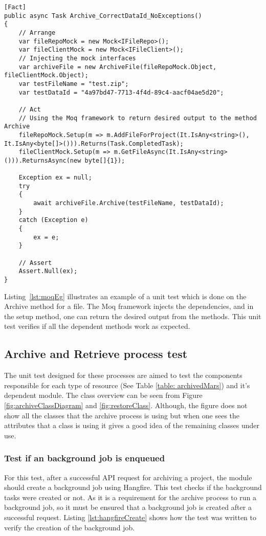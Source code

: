 \begin{lstlisting}[language={[Sharp]C}, caption={Example of faking objects using Moq framework}, captionpos=b,label={lst:moqEg}]
[Fact]
public async Task Archive_CorrectDataId_NoExceptions()
{
    // Arrange
    var fileRepoMock = new Mock<IFileRepo>();
    var fileClientMock = new Mock<IFileClient>();
    // Injecting the mock interfaces 
    var archiveFile = new ArchiveFile(fileRepoMock.Object, fileClientMock.Object);
    var testFileName = "test.zip";
    var testDataId = "4a97bd47-7713-4f4d-89c4-aacf04ae5d20";
    
    // Act
    // Using the Moq framework to return desired output to the method Archive
    fileRepoMock.Setup(m => m.AddFileForProject(It.IsAny<string>(), It.IsAny<byte[]>())).Returns(Task.CompletedTask);
    fileClientMock.Setup(m => m.GetFileAsync(It.IsAny<string>())).ReturnsAsync(new byte[]{1});

    Exception ex = null;
    try
    {
        await archiveFile.Archive(testFileName, testDataId);
    }
    catch (Exception e)
    {
        ex = e;
    }
    
    // Assert
    Assert.Null(ex);
}
\end{lstlisting}

Listing~\ref{lst:moqEg} illustrates an example of a unit test which is done on the Archive method for a file. The Moq framework injects the dependencies, and in the setup method,
one can return the desired output from the methods. This unit test verifies if all the dependent methods work as expected.

\subsection{Archive and Retrieve process test}
The unit test designed for these processes are aimed to test the components responsible for each type of resource (See Table \ref{table: archivedMars}) and it's 
dependent module. The class overview can be seen from Figure \ref{fig:archiveClassDiagram} and \ref{fig:restoreClass}. Although, the figure does not show all the classes that the archive process is using
but when one sees the attributes that a class is using it gives a good idea of the remaining classes under use.

\subsubsection{Test if an background job is enqueued}
For this test, after a successful API request for archiving a project, the module should create a background job using Hangfire. This test checks if the
background tasks were created or not. As it is a requirement for the archive process to run a background job, so it must be ensured that a background job is created 
after a successful request. Listing \ref{lst:hangfireCreate} shows how the test was written to verify the creation of the background job.

